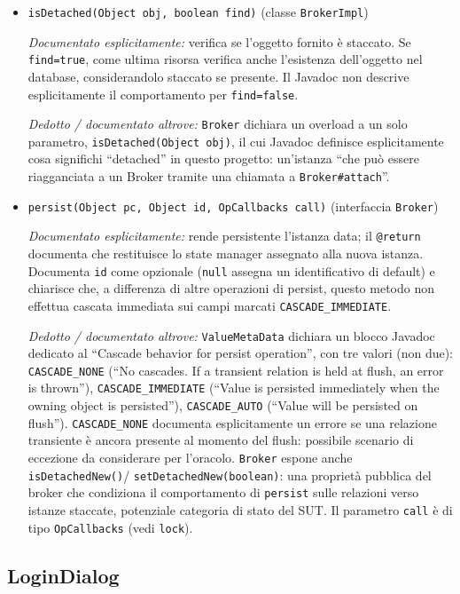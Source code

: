 \begin{itemize}[itemsep=12pt, parsep=7pt]
    \textit{Documentato esplicitamente:} crea una nuova istanza di tipo \texttt{cls}.
    Documenta due esiti: se \texttt{cls} è un'interfaccia o una classe astratta con metodi
    conformi alla convenzione JavaBeans, ne genera un'implementazione concreta dai metadati;
    se \texttt{cls} è già un tipo managed concreto, ne restituisce direttamente un'istanza;
    altrimenti lancia \texttt{IllegalArgumentException}.


    \item \texttt{isDetached(Object obj, boolean find)}
    (classe \texttt{BrokerImpl})

    \textit{Documentato esplicitamente:} verifica se l'oggetto fornito è staccato. Se
    \texttt{find=true}, come ultima risorsa verifica anche l'esistenza dell'oggetto nel
    database, considerandolo staccato se presente. Il Javadoc non descrive esplicitamente
    il comportamento per \texttt{find=false}.

    \textit{Dedotto / documentato altrove:} \texttt{Broker} dichiara un overload a
    un solo parametro, \texttt{isDetached(Object obj)}, il cui Javadoc definisce
    esplicitamente cosa significhi ``detached'' in questo progetto: un'istanza ``che può
    essere riagganciata a un Broker tramite una chiamata a \texttt{Broker\#attach}''.

    \item \texttt{persist(Object pc, Object id, OpCallbacks call)}
    (interfaccia \texttt{Broker})

    \textit{Documentato esplicitamente:} rende persistente l'istanza data; il \texttt{@return}
    documenta che restituisce lo state manager assegnato alla nuova istanza. Documenta
    \texttt{id} come opzionale (\texttt{null} assegna un identificativo di default) e
    chiarisce che, a differenza di altre operazioni di persist, questo metodo non effettua
    cascata immediata sui campi marcati \texttt{CASCADE\_IMMEDIATE}.

    \textit{Dedotto / documentato altrove:} \texttt{ValueMetaData} dichiara un blocco
    Javadoc dedicato al ``Cascade behavior for persist operation'', con tre valori (non
    due): \texttt{CASCADE\_NONE} (``No cascades. If a transient relation is held at flush,
    an error is thrown''), \texttt{CASCADE\_IMMEDIATE} (``Value is persisted immediately
    when the owning object is persisted''), \texttt{CASCADE\_AUTO} (``Value will be
    persisted on flush''). \texttt{CASCADE\_NONE} documenta esplicitamente un errore se una
    relazione transiente è ancora presente al momento del flush: possibile scenario di
    eccezione da considerare per l'oracolo. \texttt{Broker} espone anche \texttt{isDetachedNew()}/
    \texttt{setDetachedNew(boolean)}: una proprietà
    pubblica del broker che condiziona il comportamento di \texttt{persist} sulle relazioni
    verso istanze staccate, potenziale categoria di stato del SUT. Il
    parametro \texttt{call} è di tipo \texttt{OpCallbacks} (vedi \texttt{lock}).
\end{itemize}

\subsection{LoginDialog}

